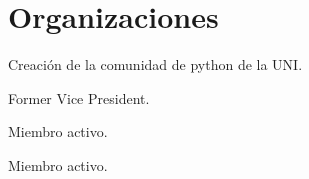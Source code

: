 \section{Organizaciones}

{Creación de la comunidad de python de la UNI.}  

{Former Vice President.}  

{Miembro activo.}  

{Miembro activo.}  